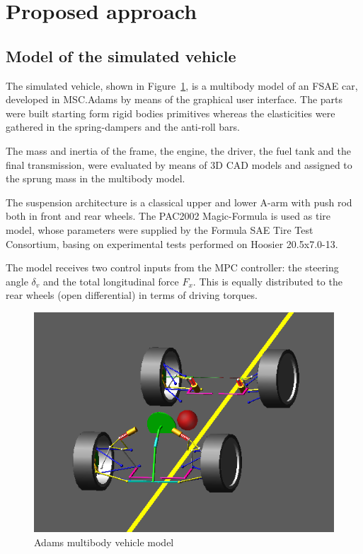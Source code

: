 \documentclass[conference]{IEEEtran} %
\begin{document}

\section{Proposed approach} %


\subsection{Model of the simulated vehicle}
The simulated vehicle, shown in Figure~\ref{fig:Adams_vehicle}, is a multibody model of an FSAE car, developed in MSC.Adams by means of the graphical user interface. The parts were built starting form rigid bodies primitives whereas the elasticities were gathered in the spring-dampers and the anti-roll bars.

The mass and inertia of the frame, the engine, the driver, the fuel
tank and the final transmission, were evaluated by means of 3D CAD models and
assigned to the sprung mass in the multibody model.

The suspension architecture is a classical upper and lower A-arm with push rod both in front and rear wheels. The PAC2002 Magic-Formula is used as tire model, whose parameters were supplied by the Formula SAE Tire Test Consortium, basing on experimental tests performed on Hoosier 20.5x7.0-13.

The model receives two control inputs from the MPC controller: the steering angle $\delta_v$ and the total longitudinal force $F_{x}$. This is equally distributed to the rear wheels (open differential) in terms of driving torques.

\begin{figure}[htb] \centering
	
	\includegraphics[width=0.8\linewidth]{adams_vehicle}
	
	\caption{Adams multibody vehicle model}
	
	\label{fig:Adams_vehicle}
	
\end{figure}
\end{document}
